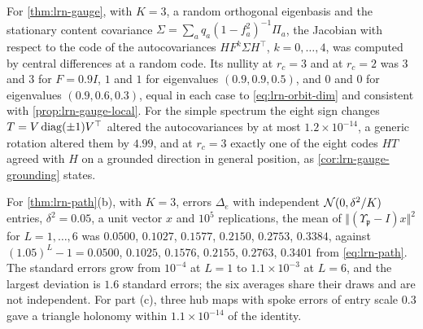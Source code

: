 \begin{numcheck}\label{chk:lrn-gauge}
For \cref{thm:lrn-gauge}, with $K=3$, a random orthogonal eigenbasis and the stationary content covariance $\Sigma=\sum_aq_a(1-f_a^2)^{-1}\Pi_a$, the Jacobian with respect to the code of the autocovariances $HF^k\Sigma H^\top$, $k=0,\dots,4$, was computed by central differences at a random code. Its nullity at $r_c=3$ and at $r_c=2$ was $3$ and $3$ for $F=0.9I$, $1$ and $1$ for eigenvalues $(0.9,0.9,0.5)$, and $0$ and $0$ for eigenvalues $(0.9,0.6,0.3)$, equal in each case to \cref{eq:lrn-orbit-dim} and consistent with \cref{prop:lrn-gauge-local}. For the simple spectrum the eight sign changes $T=V\operatorname{diag}(\pm1)V^\top$ altered the autocovariances by at most $1.2\times10^{-14}$, a generic rotation altered them by $4.99$, and at $r_c=3$ exactly one of the eight codes $HT$ agreed with $H$ on a grounded direction in general position, as \cref{cor:lrn-gauge-grounding} states.
\end{numcheck}

\begin{numcheck}\label{chk:lrn-path}
For \cref{thm:lrn-path}(b), with $K=3$, errors $\Delta_e$ with independent $\mathcal{N}(0,\delta^2/K)$ entries, $\delta^2=0.05$, a unit vector $x$ and $10^5$ replications, the mean of $\Vert(\Upsilon_{\mathfrak p}-I)x\Vert^2$ for $L=1,\dots,6$ was $0.0500$, $0.1027$, $0.1577$, $0.2150$, $0.2753$, $0.3384$, against $(1.05)^L-1=0.0500$, $0.1025$, $0.1576$, $0.2155$, $0.2763$, $0.3401$ from \cref{eq:lrn-path}. The standard errors grow from $10^{-4}$ at $L=1$ to $1.1\times10^{-3}$ at $L=6$, and the largest deviation is $1.6$ standard errors; the six averages share their draws and are not independent. For part (c), three hub maps with spoke errors of entry scale $0.3$ gave a triangle holonomy within $1.1\times10^{-14}$ of the identity.
\end{numcheck}

